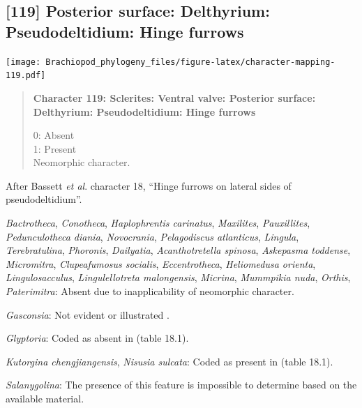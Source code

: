 \documentclass[openany]{book}
\begin{document}
\subsection*{{[}119{]} Posterior surface: Delthyrium: Pseudodeltidium:
Hinge
furrows}\label{posterior-surface-delthyrium-pseudodeltidium-hinge-furrows}

\texttt{[image: Brachiopod\_phylogeny\_files/figure-latex/character-mapping-119.pdf]}

\begin{quote}
\textbf{Character 119: Sclerites: Ventral valve: Posterior surface:
Delthyrium: Pseudodeltidium: Hinge furrows}

0: Absent\\
1: Present\\
Neomorphic character.
\end{quote}

After Bassett \emph{et al}.
\citeyearpar{Bassett2001Functionalmorphology} character 18, ``Hinge
furrows on lateral sides of pseudodeltidium''.

\hypertarget{Acanthotretella_spinosa-coding-119}{}
\emph{Bactrotheca}, \emph{Conotheca}, \emph{Haplophrentis carinatus},
\emph{Maxilites}, \emph{Pauxillites}, \emph{Pedunculotheca diania},
\emph{Novocrania}, \emph{Pelagodiscus atlanticus}, \emph{Lingula},
\emph{Terebratulina}, \emph{Phoronis}, \emph{Dailyatia},
\emph{Acanthotretella spinosa}, \emph{Askepasma toddense},
\emph{Micromitra}, \emph{Clupeafumosus socialis}, \emph{Eccentrotheca},
\emph{Heliomedusa orienta}, \emph{Lingulosacculus},
\emph{Lingulellotreta malongensis}, \emph{Micrina}, \emph{Mummpikia
nuda}, \emph{Orthis}, \emph{Paterimitra}: Absent due to inapplicability
of neomorphic character.

\hypertarget{Gasconsia-coding-119}{}
\emph{Gasconsia}: Not evident or illustrated
\citep{Hanken1985Thetaxonomy}.

\hypertarget{Glyptoria-coding-119}{}
\emph{Glyptoria}: Coded as absent in
\citet{Bassett2001Functionalmorphology} (table 18.1).

\hypertarget{Kutorgina_chengjiangensis-coding-119}{}
\emph{Kutorgina chengjiangensis}, \emph{Nisusia sulcata}: Coded as
present in \citet{Bassett2001Functionalmorphology} (table 18.1).

\hypertarget{Salanygolina-coding-119}{}
\emph{Salanygolina}: The presence of this feature is impossible to
determine based on the available material.
\end{document}
